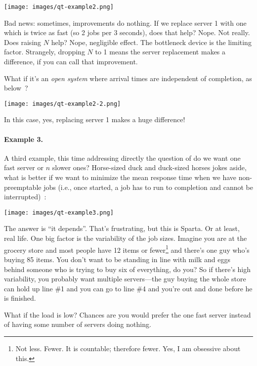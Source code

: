 \begin{center}
	\texttt{[image: images/qt-example2.png]}
\end{center}

Bad news: sometimes, improvements do nothing. If we replace server 1 with one which is twice as fast (so 2 jobs per 3 seconds), does that help? Nope. Not really. Does raising $N$ help? Nope, negligible effect. The bottleneck device is the limiting factor. Strangely, dropping $N$ to 1 means the server replacement makes a difference, if you can call that improvement. 

What if it's an \textit{open system} where arrival times are independent of completion, as below~\cite{pmd}?


\begin{center}
	\texttt{[image: images/qt-example2-2.png]}
\end{center}

In this case, yes, replacing server 1 makes a huge difference!

\paragraph{Example 3.} A third example, this time addressing directly the question of do we want one fast server or $n$ slower ones? Horse-sized duck and duck-sized horses jokes aside, what is better if we want to minimize the mean response time when we have non-preemptable jobs (i.e., once started, a job has to run to completion and cannot be interrupted)~\cite{pmd}:


\begin{center}
	\texttt{[image: images/qt-example3.png]}
\end{center}

The answer is ``it depends''. That's frustrating, but this is Sparta. Or at least, real life. One big factor is the variability of the job sizes. Imagine you are at the grocery store and most people have 12 items or fewer\footnote{Not less. Fewer. It is countable; therefore fewer. Yes, I am obsessive about this.} and there's one guy who's buying 85 items. You don't want to be standing in line with milk and eggs behind someone who is trying to buy six of everything, do you? So if there's high variability, you probably want multiple servers---the guy buying the whole store can hold up line \#1 and you can go to line \#4 and you're out and done before he is finished.

What if the load is low? Chances are you would prefer the one fast server instead of having some number of servers doing nothing.

